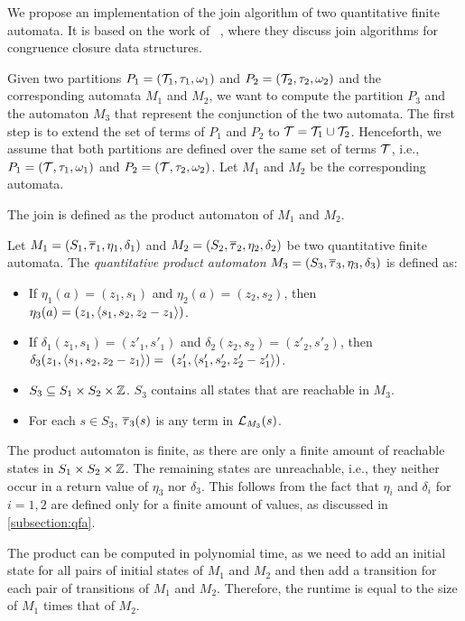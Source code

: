 We propose an implementation of the join algorithm of two quantitative finite automata.
It is based on the work of ~\textcite{join}, where they discuss join algorithms for congruence closure data structures.

Given two partitions $P_1 = (\mathcal{T}_1, \tau_1, \omega_1)$ and $P_2 = (\mathcal{T}_2, \tau_2, \omega_2)$ and the corresponding automata $M_1$ and $M_2$, we want to compute the partition $P_3$ and the automaton $M_3$ that represent the conjunction of the two automata.
The first step is to extend the set of terms of $P_1$ and $P_2$ to $\mathcal{T} = \mathcal{T}_1 \cup \mathcal{T}_2$.
Henceforth, we assume that both partitions are defined over the same set of terms $\mathcal{T}$,
i.e., $P_1 = (\mathcal{T}, \tau_1, \omega_1)$ and $P_2 = (\mathcal{T}, \tau_2, \omega_2)$.
Let $M_1$ and $M_2$ be the corresponding automata.

The join is defined as the product automaton of $M_1$ and $M_2$.

\begin{definition}
    Let $M_1 = (S_1, \overline{\tau}_1, \eta_1, \delta_1)$ and $M_2 = (S_2, \overline{\tau}_2, \eta_2, \delta_2)$ be two quantitative finite automata.
    The \emph{quantitative product automaton} $M_3 = (S_3, \overline{\tau}_3, \eta_3, \delta_3)$ is defined as:
    \begin{itemize}
        \item If $\eta_1(a) = (z_1, s_1)$ and $\eta_2(a) = (z_2, s_2)$, then
              $\eta_3(a) = (z_1, \langle s_1, s_2, z_2-z_1\rangle)$.
        \item If $\delta_1(z_1, s_1) = (z'_1, s'_1)$ and $\delta_2(z_2, s_2) = (z'_2, s'_2)$, then $\delta_3(z_1, \angl{s_1, s_2, z_2 - z_1}) =  (z'_1, \angl{s'_1, s'_2, z'_2 -z'_1})$.
        \item $S_3 \subseteq S_1 \times S_2 \times \mathbb{Z}$. $S_3$ contains all states that are reachable in $M_3$.
        \item For each $s \in S_3$, $\overline{\tau}_3(s)$ is any term in $\mathcal{L}_{M_3}(s)$.
    \end{itemize}
\end{definition}

The product automaton is finite, as there are only a finite amount of reachable states in $S_1 \times S_2 \times \mathbb{Z}$.
The remaining states are unreachable, i.e., they neither occur in a return value of $\eta_3$ nor $\delta_3$.
This follows from the fact that $\eta_i$ and $\delta_i$ for $i = 1,2$ are defined only for a finite amount of values, as discussed in \cref{subsection:qfa}.

The product can be computed in polynomial time, as we need to add an initial state for all pairs of initial states of $M_1$ and $M_2$ and then add a transition for each pair of transitions of $M_1$ and $M_2$. Therefore, the runtime is equal to the size of $M_1$ times that of $M_2$.


